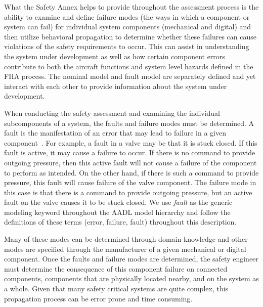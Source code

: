 What the Safety Annex helps to provide throughout the assessment process is the ability to examine and define failure modes (the ways in which a component or system can fail) for individual system components (mechanical and digital) and then utilize behavioral propagation to determine whether these failures can cause violations of the safety requirements to occur. This can assist in understanding the system under development as well as how certain component errors contribute to both the aircraft functions and system level hazards defined in the FHA process. The nominal model and fault model are separately defined and yet interact with each  other to provide information about the system under development.

When conducting the safety assessment and examining the individual subcomponents of a system, the faults and failure modes must be determined. A fault is the manifestation of an error that may lead to failure in a given component~\cite{SAE:ARP4754A}. For example, a fault in a valve may be that it is stuck closed. If this fault is active, it may cause a failure to occur. If there is no command to provide outgoing pressure, then this active fault will not cause a failure of the component to perform as intended. On the other hand, if there is such a command to provide pressure, this fault will cause failure of the valve component. The failure mode in this case is that there is a command to provide outgoing pressure, but an active fault on the valve causes it to be stuck closed. We use {\em fault} as the generic modeling keyword throughout the AADL model hierarchy and follow the definitions of these terms (error, failure, fault) throughout this description.

Many of these modes can be determined through domain knowledge and other modes are specified through the manufacturer of a given mechanical or digital component. Once the faults and failure modes are determined, the safety engineer must determine the consequence of this component failure on connected components, components that are physically located nearby, and on the system as a whole. Given that many safety critical systems are quite complex, this propagation process can be error prone and time consuming.

